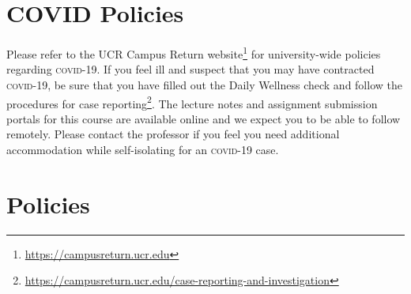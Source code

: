 \documentclass[12pt]{article}
\newcommand{\acro}[1]{\textsc{\MakeLowercase{#1}}}
\numberwithin{equation}{section}    %
\begin{document}
\section*{COVID Policies}

Please refer to the UCR Campus Return website\footnote{\url{https://campusreturn.ucr.edu}} for university-wide policies regarding \acro{COVID-19}. If you feel ill and suspect that you may have contracted \acro{COVID-19}, be sure that you have filled out the Daily Wellness check and follow the procedures for case reporting\footnote{\url{https://campusreturn.ucr.edu/case-reporting-and-investigation}}. The lecture notes and assignment submission portals for this course are available online and we expect you to be able to follow remotely. Please contact the professor if you feel you need additional accommodation while self-isolating for an \acro{COVID-19} case.


\section*{Policies}
\end{document}
